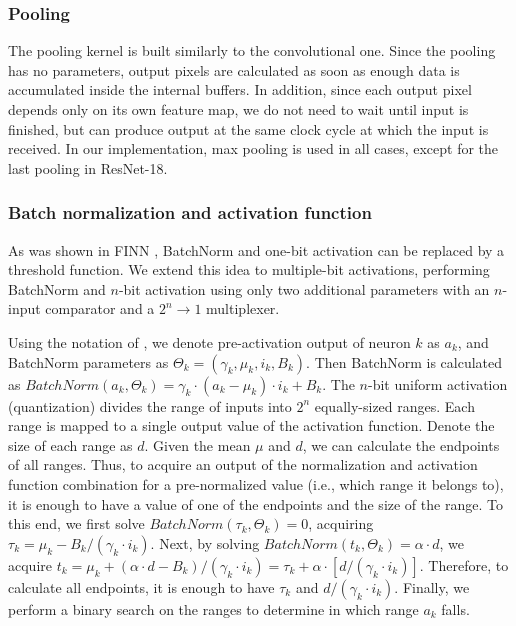 \documentclass[conference]{IEEEtran}
\begin{document}
	\subsubsection {Pooling}
	The pooling kernel is built similarly to the convolutional one. Since the pooling has no parameters, output pixels are calculated as soon as enough data is accumulated inside the internal buffers. In addition, since each output pixel depends only on its own feature map, we do not need to wait until input is finished, but can produce output at the same clock cycle at which the input is received.
	In our implementation, max pooling is used in all cases, except for the last pooling in ResNet-18.
	
	
	\subsubsection {Batch normalization and activation function}
	As was shown in FINN \cite{Umuroglu:2017:FFF:3020078.3021744}, BatchNorm and one-bit activation can be replaced by a threshold function. We extend this idea to multiple-bit activations, performing BatchNorm and $n$-bit activation using only two additional parameters with an $n$-input comparator and a $2^n\to 1$ multiplexer. 
	
	Using the notation of \cite{Umuroglu:2017:FFF:3020078.3021744}, we denote pre-activation output of neuron $k$ as $a_k$, and BatchNorm parameters as $\Theta_k = \left( \gamma_k, \mu_k, i_k, B_k \right)$. Then BatchNorm is calculated as $BatchNorm\left(a_k,\Theta_k\right) = \gamma_k \cdot \left(a_k - \mu_k\right) \cdot i_k + B_k $. 
	The $n$-bit uniform activation (quantization) divides the range of inputs into $2^n$ equally-sized ranges. Each range is mapped to a single output value of the activation function.
	Denote the size of each range as $d$. Given the mean $\mu$ and $d$, we can calculate the endpoints of all ranges. Thus, to acquire an output of the normalization and activation function combination for a pre-normalized value (i.e.,  which range it belongs to), it is enough to have a value of one of the endpoints and the size of the range.
	To this end, we first solve $BatchNorm\left(\tau_k,\Theta_k\right) = 0$, acquiring $\tau_k = \mu_k - B_k / \left(\gamma_k \cdot i_k\right)$. Next, by solving $BatchNorm\left(t_k,\Theta_k\right) = \alpha \cdot d$, we acquire $t_k = \mu_k + \left(\alpha \cdot d - B_k\right)/\left(\gamma_k \cdot i_k\right) = \tau_k + \alpha  \cdot \left[d/\left(\gamma_k \cdot i_k\right) \right] $. Therefore, to calculate all endpoints, it is enough to have $\tau_k$ and $d/\left(\gamma_k \cdot i_k\right)$. Finally, we perform a binary search on the ranges to determine in which range $a_k$ falls. 
	
\end{document}
